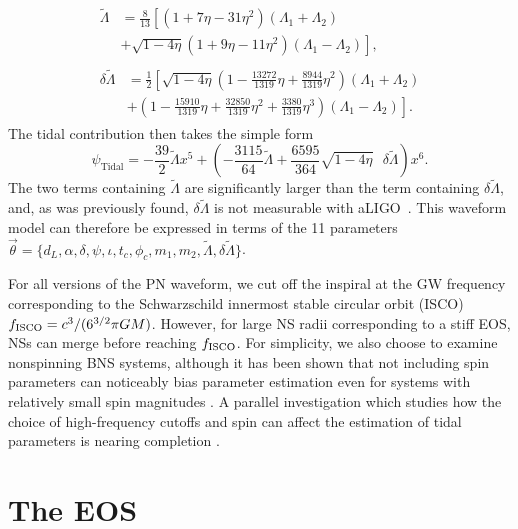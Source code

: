 \documentclass[twocolumn,prd,amssymb,aps,nofootinbib,showpacs,epsf]{revtex4}
\begin{document}
\begin{align}
\begin{split}
\label{eq:LT}
\tilde{\Lambda}&=\frac{8}{13}\left[\left(1+7\eta-31\eta^2\right)\left(\Lambda_1+\Lambda_2\right)\right.\\
&+ \left.\sqrt{1-4\eta}\left(1+9\eta-11\eta^2\right)\left(\Lambda_1-\Lambda_2\right)\right],
\end{split}\\
\begin{split}
\label{eq:dLT}
\delta\tilde{\Lambda}&=\frac{1}{2}\left[\sqrt{1-4\eta}\left(1-\frac{13272}{1319}\eta+\frac{8944}{1319}\eta^2\right)\left(\Lambda_1+\Lambda_2\right) \right .\\
& + \left . \left(1-\frac{15910}{1319}\eta+\frac{32850}{1319}\eta^2+\frac{3380}{1319}\eta^3\right)\left(\Lambda_1-\Lambda_2\right)\right].
\end{split}
\end{align}
The tidal contribution then takes the simple form
\begin{equation}
\label{eq:psi_tidal}
\psi_\text{Tidal} = -\frac{39}{2}\tilde{\Lambda} x^5+ \left(-\frac{3115}{64}\tilde{\Lambda}+\frac{6595}{364}\sqrt{1-4\eta}\mbox{ }\delta\tilde{\Lambda}\right) x^6.
\end{equation}
The two terms containing $\tilde\Lambda$ are significantly larger than the term containing $\delta\tilde\Lambda$, and, as was previously found, $\delta\tilde\Lambda$ is not measurable with aLIGO~\cite{WadeCreightonOchsner2014}. This waveform model can therefore be expressed in terms of the 11 parameters $\vec\theta = \{d_L, \alpha, \delta, \psi, \iota, t_c, \phi_c, m_1, m_2, \tilde\Lambda, \delta\tilde\Lambda\}$.

For all versions of the PN waveform, we cut off the inspiral at the GW frequency corresponding to the Schwarzschild innermost stable circular orbit (ISCO) $f_{\rm ISCO} = c^3/(6^{3/2}\pi G M)$.  However, for large NS radii corresponding to a stiff EOS, NSs can merge before reaching $f_{\rm ISCO}$. For simplicity, we also choose to examine nonspinning BNS systems, although it has been shown that not including spin parameters can noticeably bias parameter estimation even for systems with relatively small spin magnitudes \cite{Favata2014}. A parallel investigation which studies how the choice of high-frequency cutoffs and spin can affect the estimation of tidal parameters is nearing completion \cite{Agathos2014}.


\section{The EOS}
\label{sec:eos}
\end{document}
